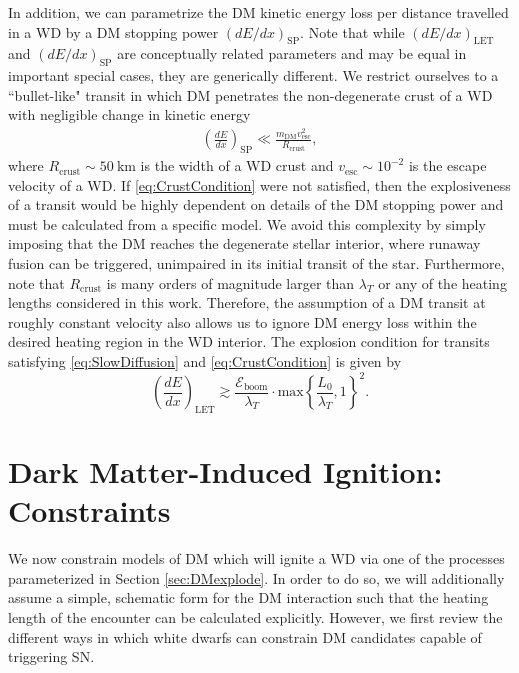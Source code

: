 \documentclass[twocolumn,preprintnumbers,amsmath,amssymb,prl, superscriptaddress]{revtex4}
\newcommand{\Eboom}{\mathcal{E}_\text{boom}}
\begin{document}
In addition, we can parametrize the DM kinetic energy loss per distance travelled in a WD by a DM stopping power $(dE/dx)_\text{SP}$.
Note that while $(dE/dx)_\text{LET}$ and $(dE/dx)_\text{SP}$ are conceptually related parameters and may be equal in important special cases, they are generically different.
We restrict ourselves to a ``bullet-like" transit in which DM penetrates the non-degenerate crust of a WD with negligible change in kinetic energy
\begin{align}
\label{eq:CrustCondition}
  \left( \frac{d E}{d x} \right)_\text{SP} \ll
  \frac{m_\text{DM} v^2_\text{esc}}{R_\text{crust}},
\end{align}
where $R_\text{crust} \sim 50 ~\text{km}$ is the width of a WD crust \cite{Chandrasekhar} and $v_\text{esc} \sim 10^{-2}$ is the escape velocity of a WD.
If \eqref{eq:CrustCondition} were not satisfied, then the explosiveness of a transit would be highly dependent on details of the DM stopping power and must be calculated from a specific model.
We avoid this complexity by simply imposing that the DM reaches the degenerate stellar interior, where runaway fusion can be triggered, unimpaired in its initial transit of the star.
Furthermore, note that $R_\text{crust}$ is many orders of magnitude larger than $\lambda_T$ or any of the heating lengths considered in this work.
Therefore, the assumption of a DM transit at roughly constant velocity also allows us to ignore DM energy loss within the desired heating region in the WD interior.
The explosion condition for transits satisfying \eqref{eq:SlowDiffusion} and \eqref{eq:CrustCondition} is given by
\begin{equation}
\label{eq:transitexplosion}
  \left( \frac{d E}{d x} \right)_\text{LET} \gtrsim \frac{\Eboom}{\lambda_T} \cdot \text{max} \left \{\frac{L_0}{\lambda_T}, 1 \right \}^2.
\end{equation}
\section{Dark Matter-Induced Ignition: Constraints}
\label{sec:Constraints}

We now constrain models of DM which will ignite a WD via one of the processes parameterized in Section \ref{sec:DMexplode}.
In order to do so, we will additionally assume a simple, schematic form for the DM interaction such that the heating length of the encounter can be calculated explicitly.
However, we first review the different ways in which white dwarfs can constrain DM candidates capable of triggering SN.
\end{document}
